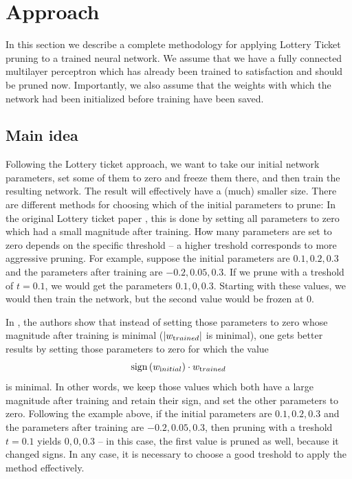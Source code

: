 \documentclass[12pt,final,twoside]{article}
\theoremstyle{plain}
\theoremstyle{definition}
\theoremstyle{remark}
\theoremstyle{named}
\begin{document}

\section{Approach}
In this section we describe a complete methodology for applying Lottery Ticket pruning to a trained neural network. We assume that we have a fully connected multilayer perceptron which has already been trained to satisfaction and should be pruned now. Importantly, we also assume that the weights with which the network had been initialized before training have been saved.

\subsection{Main idea}
Following the Lottery ticket approach, we want to take our initial network parameters, set some of them to zero and freeze them there, and then train the resulting network. The result will effectively have a (much) smaller size.
There are different methods for choosing which of the initial parameters to prune: In the original Lottery ticket paper \cite{lottery}, this is done by setting all parameters to zero which had a small magnitude after training. How many parameters are set to zero depends on the specific threshold -- a higher treshold corresponds to more aggressive pruning. For example, suppose the initial parameters are $0.1, 0.2, 0.3$ and the parameters after training are $-0.2, 0.05, 0.3$. If we prune with a treshold of $t = 0.1$, we would get the parameters $0.1, 0, 0.3$. Starting with these values, we would then train the network, but the second value would be frozen at $0$.

In \cite{supermask}, the authors show that instead of setting those parameters to zero whose magnitude after training is minimal ($|w_{\text trained}|$ is minimal), one gets better results by setting those parameters to zero for which the value 
$$
\operatorname{sign}\left(w_{\text initial}\right) \cdot w_{\text trained}
$$
is minimal. In other words, we keep those values which both have a large magnitude after training and retain their sign, and set the other parameters to zero. Following the example above, if the initial parameters are $0.1, 0.2, 0.3$ and the parameters after training are $-0.2, 0.05, 0.3$, then pruning with a treshold $t=0.1$ yields $0, 0, 0.3$ -- in this case, the first value is pruned as well, because it changed signs.
In any case, it is necessary to choose a good treshold to apply the method effectively.
\end{document}
